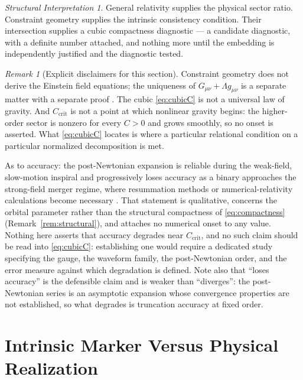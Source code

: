 \documentclass[11pt,a4paper]{article}
\theoremstyle{definition}
\theoremstyle{plain}
\theoremstyle{remark}
\newtheorem{remark}[definition]{Remark}
\newtheorem{interpretation}[definition]{Structural Interpretation}
\newcommand{\Ccrit}{C_{\mathrm{crit}}}
\begin{document}
\begin{interpretation}
General relativity supplies the physical sector ratio. Constraint geometry
supplies the intrinsic consistency condition. Their intersection supplies a
cubic compactness diagnostic --- a candidate diagnostic, with a definite
number attached, and nothing more until the embedding is independently
justified and the diagnostic tested.
\end{interpretation}

\begin{remark}[Explicit disclaimers for this section]
Constraint geometry does not derive the Einstein field equations; the
uniqueness of $G_{\mu\nu}+\Lambda g_{\mu\nu}$ is a separate matter with a
separate proof \cite{Lovelock71,Wald}. The cubic \eqref{eq:cubicC} is not a
universal law of gravity. And $\Ccrit$ is not a point at which nonlinear
gravity begins: the higher-order sector is nonzero for every $C>0$ and grows
smoothly, so no onset is asserted. What \eqref{eq:cubicC} locates is where a
particular relational condition on a particular normalized decomposition is
met.

As to accuracy: the post-Newtonian expansion is reliable during the weak-field,
slow-motion inspiral and progressively loses accuracy as a binary approaches the
strong-field merger regime, where resummation methods or numerical-relativity
calculations become necessary \cite{Blanchet2024}. That statement is
qualitative, concerns the orbital parameter rather than the structural
compactness of \eqref{eq:compactness} (Remark~\ref{rem:structural}), and
attaches no numerical onset to any value. Nothing here asserts that accuracy
degrades near $\Ccrit$, and no such claim should be read into
\eqref{eq:cubicC}: establishing one would require a dedicated study specifying
the gauge, the waveform family, the post-Newtonian order, and the error measure
against which degradation is defined. Note also that ``loses accuracy'' is the
defensible claim and is weaker than ``diverges'': the post-Newtonian series is
an asymptotic expansion whose convergence properties are not established, so
what degrades is truncation accuracy at fixed order.
\end{remark}

\section{Intrinsic Marker Versus Physical Realization}
\label{sec:marker}
\end{document}
